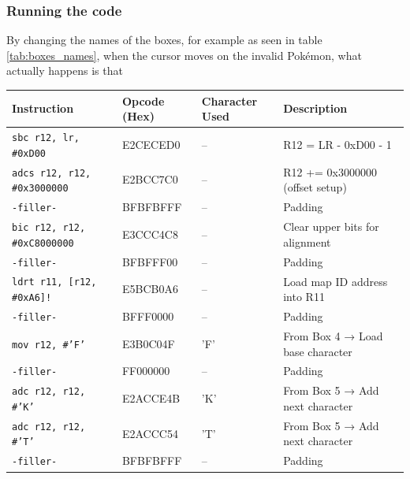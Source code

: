 \documentclass[a4paper]{usiinfbachelorproject}
\begin{document}
\subsubsection{\textbf{Running the code}}
\label{sec:running_the_code}
By changing the names of the boxes, for example as seen in table \ref{tab:boxes_names}, when the cursor moves on the invalid Pokémon, what actually happens is that

\begin{table}
	\begin{tabular}{|l|l|l|p{6cm}|}
		\hline
		\textbf{Instruction}                & \textbf{Opcode (Hex)} & \textbf{Character Used} & \textbf{Description}               \\
		\hline
		\texttt{sbc r12, lr, \#0xD00}       & E2CECED0              & --                      & R12 = LR - 0xD00 - 1               \\
		\texttt{adcs r12, r12, \#0x3000000} & E2BCC7C0              & --                      & R12 += 0x3000000 (offset setup)    \\
		\texttt{-filler-}                   & BFBFBFFF              & --                      & Padding                            \\
		\texttt{bic r12, r12, \#0xC8000000} & E3CCC4C8              & --                      & Clear upper bits for alignment     \\
		\texttt{-filler-}                   & BFBFFF00              & --                      & Padding                            \\
		\texttt{ldrt r11, [r12, \#0xA6]!}   & E5BCB0A6              & --                      & Load map ID address into R11       \\
		\texttt{-filler-}                   & BFFF0000              & --                      & Padding                            \\
		\texttt{mov r12, \#'F'}             & E3B0C04F              & 'F'                     & From Box 4 → Load base character   \\
		\texttt{-filler-}                   & FF000000              & --                      & Padding                            \\
		\texttt{adc r12, r12, \#'K'}        & E2ACCE4B              & 'K'                     & From Box 5 → Add next character    \\
		\texttt{adc r12, r12, \#'T'}        & E2ACCC54              & 'T'                     & From Box 5 → Add next character    \\
		\texttt{-filler-}                   & BFBFBFFF              & --                      & Padding                            \\

\end{tabular}
\end{table}
\end{document}
